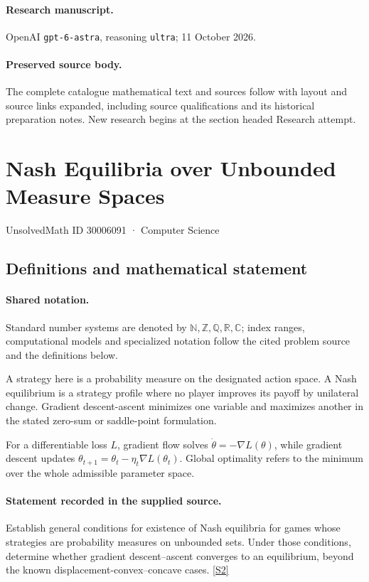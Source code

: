 \documentclass[11pt]{article}
\begin{document}
\paragraph{Research manuscript.} OpenAI \texttt{gpt-6-astra}, reasoning \texttt{ultra}; 11 October 2026.
\paragraph{Preserved source body.} The complete catalogue mathematical text and sources follow with layout and source links expanded, including source qualifications and its historical preparation notes. New research begins at the section headed Research attempt.

\section{Nash Equilibria over Unbounded Measure Spaces}\label{30006091}
{\small UnsolvedMath ID 30006091 · Computer Science}
\subsection{Definitions and mathematical statement}

\paragraph{Shared notation.}Standard number systems are denoted by $\mathbb N,\mathbb Z,\mathbb Q,\mathbb R,\mathbb C$; index ranges, computational models and specialized notation follow the cited problem source and the definitions below.


A strategy here is a probability measure on the designated action space. A Nash equilibrium is a strategy profile where no player improves its payoff by unilateral change. Gradient descent-ascent minimizes one variable and maximizes another in the stated zero-sum or saddle-point formulation.

For a differentiable loss $L$, gradient flow solves $\dot\theta=-\nabla L(\theta)$, while gradient descent updates $\theta_{t+1}=\theta_t-\eta_t\nabla L(\theta_t)$. Global optimality refers to the minimum over the whole admissible parameter space.
\paragraph{Statement recorded in the supplied source.}
Establish general conditions for existence of Nash equilibria for games whose strategies are probability measures on unbounded sets. Under those conditions, determine whether gradient descent–ascent converges to an equilibrium, beyond the known displacement-convex–concave cases. \href{https://doi.org/10.4171/owr/2024/56}{[S2]}
\end{document}
